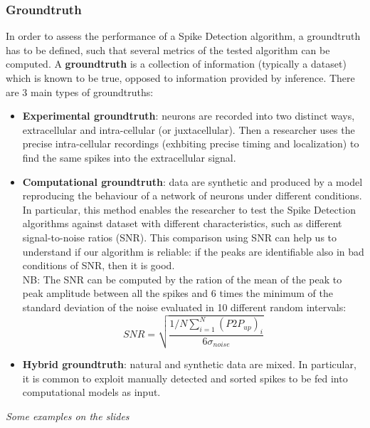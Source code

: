 \subsubsection{Groundtruth}
In order to assess the performance of a Spike Detection algorithm, a groundtruth has to be defined, such that several metrics of the tested algorithm can be computed. A \textbf{groundtruth} is a collection of information (typically a dataset)
which is known to be true, opposed to information provided by inference.
There are 3 main types of groundtruths:
\begin{itemize}
    \item \textbf{Experimental groundtruth}: neurons are recorded into two distinct ways, extracellular and intra-cellular (or juxtacellular). Then a researcher uses the precise intra-cellular recordings (exhbiting precise timing and localization) to find the same spikes into the extracellular signal.
    \item \textbf{Computational groundtruth}: data are synthetic and produced by a model reproducing the behaviour of a network of neurons under different conditions.\\ 
    In particular, this method enables the researcher to test the Spike Detection algorithms against dataset with different characteristics, such as different signal-to-noise ratios (SNR). This comparison using SNR can help us to understand if our algorithm is reliable: if the peaks are identifiable also in bad conditions of SNR, then it is good.\\
    NB: The SNR can be computed by the ration of the mean of the peak to peak amplitude between all the spikes and 6 times the minimum of the standard deviation of the noise evaluated in 10 different random intervals:
    \begin{equation*}
        SNR = \sqrt{\frac{1/N\sum_{i=1}^N(P2P_{up})_i}{6\sigma_{noise}}}
    \end{equation*}
    \item \textbf{Hybrid groundtruth}: natural and synthetic data are mixed. In particular, it is common to exploit manually detected and sorted spikes to be fed into computational models as input.
\end{itemize}
\textit{Some examples on the slides}\\
